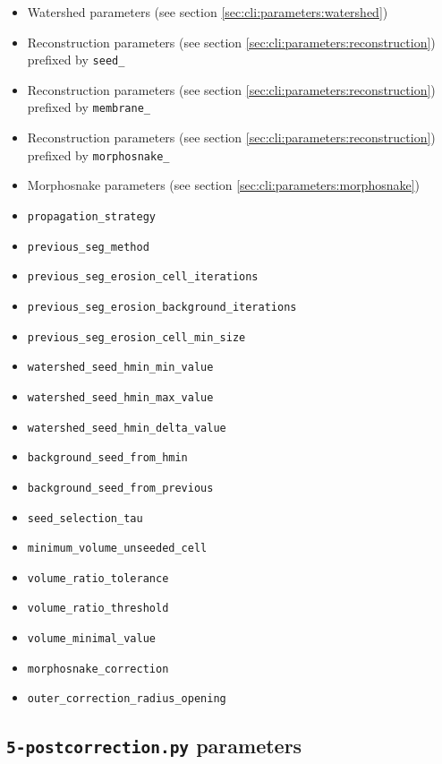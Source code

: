 \begin{itemize}
\itemsep -0.5ex
\item Watershed parameters 
  (see section \ref{sec:cli:parameters:watershed})
\item Reconstruction parameters
  (see section \ref{sec:cli:parameters:reconstruction})
  prefixed by \texttt{seed\_}
\item Reconstruction parameters
  (see section \ref{sec:cli:parameters:reconstruction})
  prefixed by \texttt{membrane\_}
\item Reconstruction parameters
  (see section \ref{sec:cli:parameters:reconstruction})
  prefixed by \texttt{morphosnake\_}
\item Morphosnake parameters
  (see section \ref{sec:cli:parameters:morphosnake})
\item \texttt{propagation\_strategy}
\item \texttt{previous\_seg\_method}
\item \texttt{previous\_seg\_erosion\_cell\_iterations}
\item \texttt{previous\_seg\_erosion\_background\_iterations}
\item \texttt{previous\_seg\_erosion\_cell\_min\_size}
\item \texttt{watershed\_seed\_hmin\_min\_value}
\item \texttt{watershed\_seed\_hmin\_max\_value}
\item \texttt{watershed\_seed\_hmin\_delta\_value}
\item \texttt{background\_seed\_from\_hmin}
\item \texttt{background\_seed\_from\_previous}
\item \texttt{seed\_selection\_tau}
\item \texttt{minimum\_volume\_unseeded\_cell}
\item \texttt{volume\_ratio\_tolerance}
\item \texttt{volume\_ratio\_threshold}
\item \texttt{volume\_minimal\_value}
\item \texttt{morphosnake\_correction}
\item \texttt{outer\_correction\_radius\_opening}
\end{itemize}

\subsection{\texttt{5-postcorrection.py} parameters}
\label{sec:cli:parameters:postcorrection}

